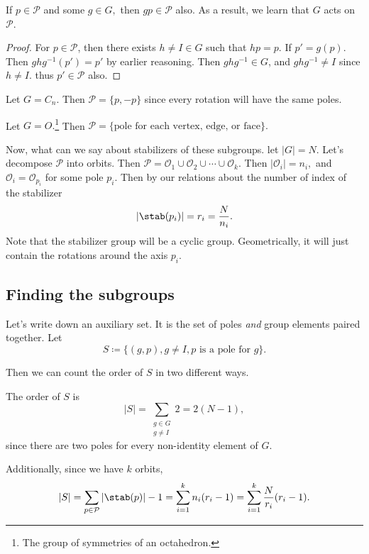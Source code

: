\begin{lemma}
If $p \in \mathcal{P}$ and some $g \in G,$ then $gp \in \mathcal{P}$ also. As a result, we learn that $G$ acts on $\mathcal{P}$. 
\end{lemma}

\begin{proof}
For $p \in \mathcal{P}$, then there exists $h \neq I \in G$ such that $hp = p.$ If $p' = g(p).$ Then $ghg^{-1}(p') = p'$ by earlier reasoning. Then $ghg^{-1} \in G$, and $ghg^{-1}\neq I$ since $h \neq I.$ thus $p' \in \mathcal{P}$ also.
\end{proof}

\begin{example}
\label{CyclicPoles}
Let $G = C_n$. Then $\mathcal{P} = \{p, -p\}$ since every rotation will have the same poles.
\end{example}

\begin{example}
\label{PolyhedraPoles}
Let $G = O.$\footnote{The group of symmetries of an octahedron.} Then $\mathcal{P} = \{\text{pole for each vertex, edge, or face}\}.$ %
\end{example}

Now, what can we say about stabilizers of these subgroups. let $|G| = N.$ Let's decompose $\mathcal{P}$ into orbits. Then $\mathcal{P} = \mathcal{O}_1 \cup \mathcal{O}_2 \cup \cdots \cup \mathcal{O}_k$. Then $|\mathcal{O}_i| = n_i,$ and $\mathcal{O}_i = \mathcal{O}_{p_i}$ for some pole $p_i$. Then by our relations about the number of index of the stabilizer
\[
|\stab(p_i)| = r_i = \frac{N}{n_i}.
\]
Note that the stabilizer group will be a cyclic group.
Geometrically, it will just contain the rotations around the axis $p_i$.

\subsection{Finding the subgroups}

Let's write down an auxiliary set. It is the set of poles \emph{and} group elements paired together. Let 
\[
S \coloneqq \{(g, p), g \neq I, p \text{ is a pole for }g\}.
\]

Then we can count the order of $S$ in two different ways. 

The order of $S$ is
\[
|S| = \sum_{\substack{g \in G\\ g \neq I}} 2 = 2(N-1),
\]
since there are two poles for every non-identity element of $G.$

Additionally, since we have $k$ orbits,
\[
|S| = \sum_{p \in \mathcal{P}} |\stab(p)|  - 1 = \sum_{i = 1}^k n_i(r_i - 1) = \sum_{i=1}^k \frac{N}{r_i}(r_i - 1).
\]

